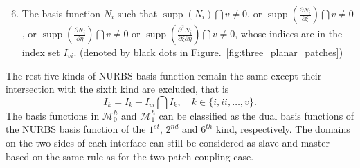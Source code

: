 \documentclass[preprint,12pt]{elsarticle}
\newcommand{\supp}{\mathop{\mathrm{supp}}}
\theoremstyle{remark}
\begin{document}
\begin{enumerate}
    \setcounter{enumi}{5}
    \item The basis function $N_i$ such that $\supp(N_i)\bigcap{v}\neq{}0$, or $\supp(\frac{\partial{}N_i}{\partial\xi})\bigcap{v}\neq{}0$,  or $\supp(\frac{\partial{}N_i}{\partial\eta})\bigcap{v}\neq{}0$ or $\supp(\frac{\partial^2{}N_i}{\partial\xi\partial\eta})\bigcap{v}\neq{}0$, whose indices are in the index set $I_{vi}$. (denoted by black dots in Figure.~\ref{fig:three_planar_patches})
\end{enumerate}
The rest five kinds of NURBS basis function remain the same except their intersection with the sixth kind are excluded, that is
\begin{equation}
    I_k=I_k-I_{vi}\bigcap{}I_k, \quad k\in\{i,ii,\dots,v\}.
\end{equation}
The basis functions in $\mathcal{M}_0^h$ and $\mathcal{M}_1^h$ can be classified as the dual basis functions of the NURBS basis function of the $1^{st}$, $2^{nd}$ and $6^{th}$ kind, respectively. The domains on the two sides of each interface can still be considered as slave and master based on the same rule as for the two-patch coupling case.
\end{document}
